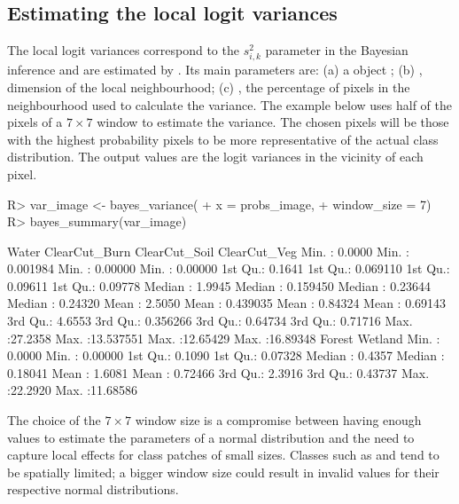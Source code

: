 \documentclass[
  shortnames]{jss}
\begin{document}
\newpage

\hypertarget{estimating-the-local-logit-variances}{%
\subsection{Estimating the local logit variances}\label{estimating-the-local-logit-variances}}

The local logit variances correspond to the \(s^2_{i,k}\) parameter in the Bayesian inference and are estimated by . Its main parameters are: (a) a  object ; (b) , dimension of the local neighbourhood; (c) , the percentage of pixels in the neighbourhood used to calculate the variance. The example below uses half of the pixels of a \(7\times 7\) window to estimate the variance. The chosen pixels will be those with the highest probability pixels to be more representative of the actual class distribution. The output values are the logit variances in the vicinity of each pixel.

\begin{CodeChunk}
\begin{CodeInput}
R> var_image <- bayes_variance(
+     x = probs_image,
+     window_size = 7)
R> bayes_summary(var_image)
\end{CodeInput}
\begin{CodeOutput}
 Water             ClearCut_Burn       ClearCut_Soil      ClearCut_Veg      
 Min.   : 0.0000   Min.   : 0.001984   Min.   : 0.00000   Min.   : 0.00000  
 1st Qu.: 0.1641   1st Qu.: 0.069110   1st Qu.: 0.09611   1st Qu.: 0.09778  
 Median : 1.9945   Median : 0.159450   Median : 0.23644   Median : 0.24320  
 Mean   : 2.5050   Mean   : 0.439035   Mean   : 0.84324   Mean   : 0.69143  
 3rd Qu.: 4.6553   3rd Qu.: 0.356266   3rd Qu.: 0.64734   3rd Qu.: 0.71716  
 Max.   :27.2358   Max.   :13.537551   Max.   :12.65429   Max.   :16.89348  
 Forest            Wetland           
 Min.   : 0.0000   Min.   : 0.00000  
 1st Qu.: 0.1090   1st Qu.: 0.07328  
 Median : 0.4357   Median : 0.18041  
 Mean   : 1.6081   Mean   : 0.72466  
 3rd Qu.: 2.3916   3rd Qu.: 0.43737  
 Max.   :22.2920   Max.   :11.68586  
\end{CodeOutput}
\end{CodeChunk}

The choice of the \(7 \times 7\) window size is a compromise between having enough values to
estimate the parameters of a normal distribution and the need to capture local effects
for class patches of small sizes. Classes such as  and 
tend to be spatially limited; a bigger window size could result in invalid values for
their respective normal distributions.
\end{document}
